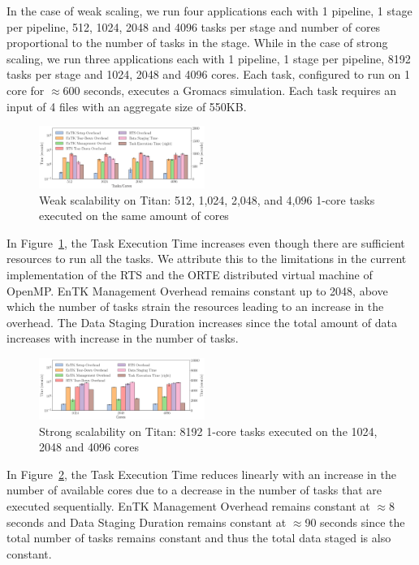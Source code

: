 In the case of weak scaling, we run four applications each with 1 pipeline, 1 
stage per pipeline, 512, 1024, 2048 and 4096 tasks per stage and number of cores
proportional to the number of tasks in the stage. While in the case of strong 
scaling, we run three applications each with 1 pipeline, 1 stage per pipeline, 
8192 tasks per stage and 1024, 2048 and 4096 cores. Each task, configured to
run on 1 core for \(\approx\)600 seconds, executes a Gromacs simulation. Each 
task requires an input of 4 files with an aggregate size of 550KB.
\begin{figure} 
\includegraphics[width=0.48\textwidth]{figs/weak_scaling_titan_orte_reduced.pdf}
\caption{Weak scalability on Titan: 512, 1,024, 2,048, and 4,096
1-core tasks executed on the same amount of cores}\label{fig:weak_scaling}
\end{figure}

In Figure~\ref{fig:weak_scaling}, the Task Execution Time increases even though
there are sufficient resources to run all the tasks. We attribute this to the
limitations in the current implementation of the RTS and the ORTE distributed 
virtual machine of OpenMP. EnTK Management Overhead remains constant up to 2048,
above which the number of tasks strain the resources leading to an increase in
the overhead. The Data Staging Duration increases since the total amount of 
data increases with increase in the number of tasks.

\begin{figure} 
\includegraphics[width=0.48\textwidth]{figs/strong_scaling_titan_orte.pdf}
\caption{Strong scalability on Titan: 8192 1-core tasks executed on the 1024, 
2048 and 4096 cores}\label{fig:strong_scaling}
\end{figure}

In Figure~\ref{fig:strong_scaling}, the Task Execution Time reduces linearly 
with an increase in the number of available cores due to a decrease in the 
number of tasks that are executed sequentially. EnTK Management Overhead 
remains constant at \(\approx\)8 seconds and Data Staging Duration remains 
constant at \(\approx\)90 seconds since the total number of tasks remains
constant and thus the total data staged is also constant.


